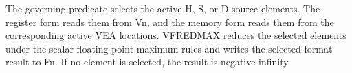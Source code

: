 The governing predicate selects the active H, S, or D source elements.
The register form reads them from Vn, and the memory form reads them from the
corresponding active VEA locations. VFREDMAX reduces the selected elements
under the scalar floating-point maximum rules and writes the selected-format
result to Fn. If no element is selected, the result is negative infinity.
